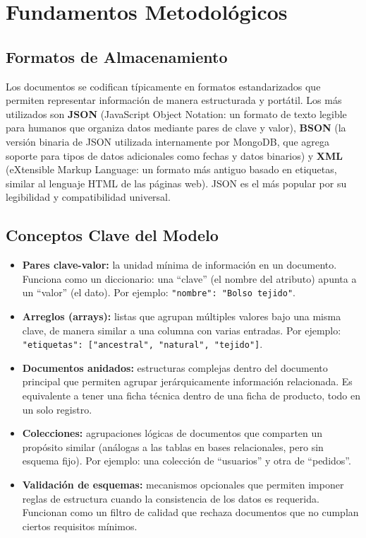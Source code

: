 \documentclass[conference]{IEEEtran}
\begin{document}
\section{Fundamentos Metodológicos}

\subsection{Formatos de Almacenamiento}
Los documentos se codifican típicamente en formatos estandarizados que permiten representar información de manera estructurada y portátil. Los más utilizados son \textbf{JSON} (JavaScript Object Notation: un formato de texto legible para humanos que organiza datos mediante pares de clave y valor), \textbf{BSON} (la versión binaria de JSON utilizada internamente por MongoDB, que agrega soporte para tipos de datos adicionales como fechas y datos binarios) y \textbf{XML} (eXtensible Markup Language: un formato más antiguo basado en etiquetas, similar al lenguaje HTML de las páginas web). JSON es el más popular por su legibilidad y compatibilidad universal.

\subsection{Conceptos Clave del Modelo}
\begin{itemize}
    \item \textbf{Pares clave-valor:} la unidad mínima de información en un documento. Funciona como un diccionario: una ``clave'' (el nombre del atributo) apunta a un ``valor'' (el dato). Por ejemplo: \texttt{"nombre": "Bolso tejido"}.
    \item \textbf{Arreglos (arrays):} listas que agrupan múltiples valores bajo una misma clave, de manera similar a una columna con varias entradas. Por ejemplo: \texttt{"etiquetas": ["ancestral", "natural", "tejido"]}.
    \item \textbf{Documentos anidados:} estructuras complejas dentro del documento principal que permiten agrupar jerárquicamente información relacionada. Es equivalente a tener una ficha técnica dentro de una ficha de producto, todo en un solo registro.
    \item \textbf{Colecciones:} agrupaciones lógicas de documentos que comparten un propósito similar (análogas a las tablas en bases relacionales, pero sin esquema fijo). Por ejemplo: una colección de ``usuarios'' y otra de ``pedidos''.
    \item \textbf{Validación de esquemas:} mecanismos opcionales que permiten imponer reglas de estructura cuando la consistencia de los datos es requerida. Funcionan como un filtro de calidad que rechaza documentos que no cumplan ciertos requisitos mínimos.
\end{itemize}
\end{document}
